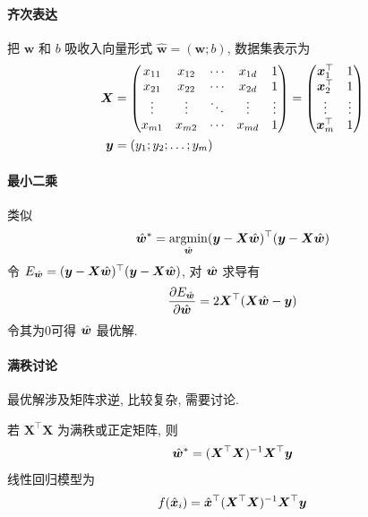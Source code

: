 \paragraph{齐次表达} 把 $\bm w$ 和 $b$ 吸收入向量形式 $\hat{\bm w}=(\bm w;b)$, 数据集表示为
\begin{align*}
    \bm{X}&=\begin{pmatrix}
        x_{11} & x_{12} & \cdots & x_{1d} & 1\\
        x_{21} & x_{22} & \cdots & x_{2d} & 1\\
        \vdots & \vdots & \ddots & \vdots & \vdots\\
        x_{m1} & x_{m2} & \cdots & x_{md} & 1\\
    \end{pmatrix}= \begin{pmatrix}
        \bm{x}_1^\top & 1\\
        \bm{x}_2^\top & 1\\
        \vdots & \vdots\\
        \bm{x}_m^\top & 1\\
    \end{pmatrix}\\
    \bm{y}&=(y_1;y_2;\dots;y_m)
\end{align*}

\paragraph{最小二乘}类似
\begin{align*}
    \hat{\bm{w}}^*=\operatorname*{argmin}_{\hat{\bm{w}}}(\bm{y} - \bm X \hat{\bm{w}})^\top(\bm{y} - \bm X \hat{\bm{w}})
\end{align*}
令 $E_{\hat{\bm{w}}}= (\bm{y} - \bm X \hat{\bm{w}})^\top(\bm{y} - \bm X \hat{\bm{w}})$, 对 $\hat{\bm{w}}$ 求导有
\begin{align*}
    \frac{\partial E_{\hat{\bm{w}}}}{\partial \hat{\bm{w}}}=2\bm{X}^\top(\bm{X}\hat{\bm{w}}-\bm{y})
\end{align*}
令其为0可得 $\hat{\bm{w}}$ 最优解. 

\paragraph{满秩讨论}最优解涉及矩阵求逆, 比较复杂, 需要讨论. 

若 $\bm{X}^\top\bm X$ 为满秩或正定矩阵, 则
\begin{align*}
    \hat{\bm{w}}^*=(\bm{X}^\top\bm X)^{-1}\bm{X}^\top \bm{y}
\end{align*}
线性回归模型为
\begin{align*}
    f(\hat{\bm{x}}_i)=\hat{\bm{x}}^\top(\bm{X}^\top\bm X)^{-1}\bm{X}^\top \bm{y}
\end{align*}

